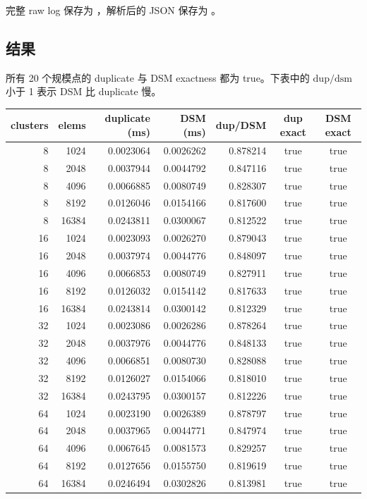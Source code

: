 完整 raw log 保存为
，解析后的 JSON 保存为
。

\subsection{结果}

所有 20 个规模点的 duplicate 与 DSM exactness 都为 true。下表中的
\(\mathrm{dup}/\mathrm{dsm}\) 小于 1 表示 DSM 比 duplicate 慢。

\begin{center}
\small
\begin{tabular}{@{}r r r r r c c@{}}
\toprule
clusters & elems & duplicate (ms) & DSM (ms) & dup/DSM & dup exact & DSM exact \\
\midrule
8  & 1024  & 0.0023064 & 0.0026262 & 0.878214 & true & true \\
8  & 2048  & 0.0037944 & 0.0044792 & 0.847116 & true & true \\
8  & 4096  & 0.0066885 & 0.0080749 & 0.828307 & true & true \\
8  & 8192  & 0.0126046 & 0.0154166 & 0.817600 & true & true \\
8  & 16384 & 0.0243811 & 0.0300067 & 0.812522 & true & true \\
16 & 1024  & 0.0023093 & 0.0026270 & 0.879043 & true & true \\
16 & 2048  & 0.0037974 & 0.0044776 & 0.848097 & true & true \\
16 & 4096  & 0.0066853 & 0.0080749 & 0.827911 & true & true \\
16 & 8192  & 0.0126032 & 0.0154142 & 0.817633 & true & true \\
16 & 16384 & 0.0243814 & 0.0300142 & 0.812329 & true & true \\
32 & 1024  & 0.0023086 & 0.0026286 & 0.878264 & true & true \\
32 & 2048  & 0.0037976 & 0.0044776 & 0.848133 & true & true \\
32 & 4096  & 0.0066851 & 0.0080730 & 0.828088 & true & true \\
32 & 8192  & 0.0126027 & 0.0154066 & 0.818010 & true & true \\
32 & 16384 & 0.0243795 & 0.0300157 & 0.812226 & true & true \\
64 & 1024  & 0.0023190 & 0.0026389 & 0.878797 & true & true \\
64 & 2048  & 0.0037965 & 0.0044771 & 0.847974 & true & true \\
64 & 4096  & 0.0067645 & 0.0081573 & 0.829257 & true & true \\
64 & 8192  & 0.0127656 & 0.0155750 & 0.819619 & true & true \\
64 & 16384 & 0.0246494 & 0.0302826 & 0.813981 & true & true \\
\bottomrule
\end{tabular}
\end{center}

